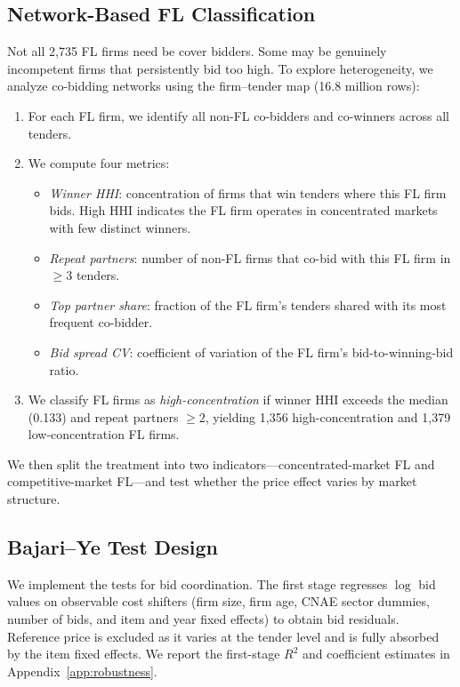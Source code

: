 \subsection{Network-Based FL Classification}
\label{sec:empirical_network}

Not all 2,735 FL firms need be cover bidders. Some may be genuinely
incompetent firms that persistently bid too high. To explore
heterogeneity, we analyze co-bidding networks using the firm--tender map
(16.8 million rows):

\begin{enumerate}
  \item For each FL firm, we identify all non-FL co-bidders and
    co-winners across all tenders.
  \item We compute four metrics:
    \begin{itemize}
      \item \emph{Winner HHI}: concentration of firms that win tenders
        where this FL firm bids. High HHI indicates the FL firm operates
        in concentrated markets with few distinct winners.
      \item \emph{Repeat partners}: number of non-FL firms that co-bid
        with this FL firm in $\geq 3$ tenders.
      \item \emph{Top partner share}: fraction of the FL firm's tenders
        shared with its most frequent co-bidder.
      \item \emph{Bid spread CV}: coefficient of variation of the FL
        firm's bid-to-winning-bid ratio.
    \end{itemize}
  \item We classify FL firms as \emph{high-concentration} if winner HHI
    exceeds the median (0.133) and repeat partners $\geq 2$, yielding
    1,356 high-concentration and 1,379 low-concentration FL firms.
\end{enumerate}

We then split the treatment into two indicators---concentrated-market FL
and competitive-market FL---and test whether the price effect varies by
market structure.

\subsection{Bajari--Ye Test Design}
\label{sec:empirical_bajari}

We implement the \citet{bajari2003deciding} tests for bid coordination.
The first stage regresses $\log$ bid values on observable cost shifters %
(firm size, firm age, CNAE sector dummies, number of bids, and item and
year fixed effects) to obtain bid residuals. Reference price is excluded
as it varies at the tender level and is fully absorbed by the item fixed
effects. We report the first-stage $R^2$ and coefficient estimates in
Appendix~\ref{app:robustness}.


